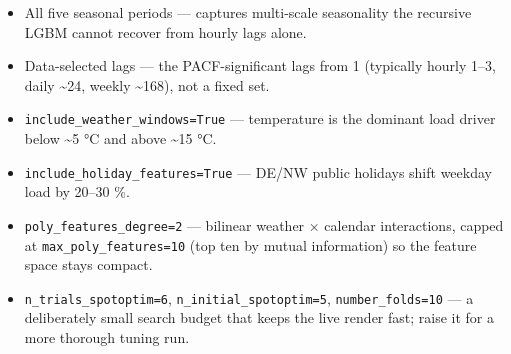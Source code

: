 \documentclass[
  english,
  letterpaper,
]{scrbook}
\providecommand{\tightlist}{%
  \setlength{\itemsep}{0pt}\setlength{\parskip}{0pt}}
\begin{document}
\begin{itemize}
\tightlist
\item
  All five seasonal periods --- captures multi-scale seasonality the
  recursive LGBM cannot recover from hourly lags alone.
\item
  Data-selected lags --- the PACF-significant lags from 1 (typically
  hourly 1--3, daily \textasciitilde24, weekly \textasciitilde168), not
  a fixed set.
\item
  \texttt{include\_weather\_windows=True} --- temperature is the
  dominant load driver below \textasciitilde5 °C and above
  \textasciitilde15 °C.
\item
  \texttt{include\_holiday\_features=True} --- DE/NW public holidays
  shift weekday load by 20--30 \%.
\item
  \texttt{poly\_features\_degree=2} --- bilinear weather × calendar
  interactions, capped at \texttt{max\_poly\_features=10} (top ten by
  mutual information) so the feature space stays compact.
\item
  \texttt{n\_trials\_spotoptim=6}, \texttt{n\_initial\_spotoptim=5},
  \texttt{number\_folds=10} --- a deliberately small search budget that
  keeps the live render fast; raise it for a more thorough tuning run.
\end{itemize}
\end{document}
